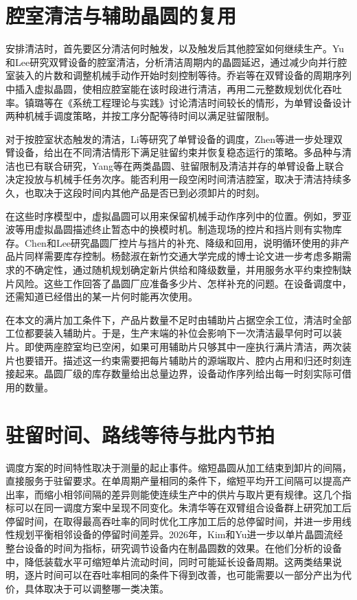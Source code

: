 \section{腔室清洁与辅助晶圆的复用}

安排清洁时，首先要区分清洁何时触发，以及触发后其他腔室如何继续生产。Yu和Lee研究双臂设备的腔室清洁，分析清洁周期内的晶圆延迟，通过减少向并行腔室装入的片数和调整机械手动作开始时刻控制等待\citep{yu2020delay}。乔岩等在双臂设备的周期序列中插入虚拟晶圆，使相应腔室能在该时段进行清洁，再用二元整数规划优化吞吐率\citep{qiao2022binary}。镇璐等在《系统工程理论与实践》讨论清洁时间较长的情形，为单臂设备设计两种机械手调度策略，并按工序分配等待时间以满足驻留限制\citep{zhen2023cnclean}。

对于按腔室状态触发的清洁，Li等研究了单臂设备的调度，Zhen等进一步处理双臂设备，给出在不同清洁情形下满足驻留约束并恢复稳态运行的策略\citep{li2022conditioncleaning,zhen2025cleaning}。多品种与清洁也已有联合研究，Yang等在两类晶圆、驻留限制及清洁并存的单臂设备上联合决定投放与机械手任务次序\citep{yang2025twoclean}。能否利用一段空闲时间清洁腔室，取决于清洁持续多久，也取决于这段时间内其他产品是否已到必须卸片的时刻。

在这些时序模型中，虚拟晶圆可以用来保留机械手动作序列中的位置。例如，罗亚波等用虚拟晶圆描述终止暂态中的换模时机\citep{luo2026mask}。制造现场的控片和挡片则有实物库存。Chen和Lee研究晶圆厂控片与挡片的补充、降级和回用，说明循环使用的非产品片同样需要库存控制\citep{chen2003dummy}。杨懿淑在新竹交通大学完成的博士论文进一步考虑多期需求的不确定性，通过随机规划确定新片供给和降级数量，并用服务水平约束控制缺片风险\citep{yang2009dummyphd}。这些工作回答了晶圆厂应准备多少片、怎样补充的问题。在设备调度中，还需知道已经借出的某一片何时能再次使用。

在本文的满片加工条件下，产品片数量不足时由辅助片占据空余工位，清洁时全部工位都要装入辅助片。于是，生产末端的补位会影响下一次清洁最早何时可以装片。即使两座腔室均已空闲，如果可用辅助片只够其中一座执行满片清洁，两次装片也要错开。描述这一约束需要把每片辅助片的源端取片、腔内占用和归还时刻连接起来。晶圆厂级的库存数量给出总量边界，设备动作序列给出每一时刻实际可借用的数量。

\section{驻留时间、路线等待与批内节拍}

调度方案的时间特性取决于测量的起止事件。缩短晶圆从加工结束到卸片的间隔，直接服务于驻留要求。在单周期产量相同的条件下，缩短平均开工间隔可以提高产出率，而缩小相邻间隔的差异则能使连续生产中的供片与取片更有规律。这几个指标可以在同一调度方案中呈现不同变化。朱清华等在双臂组合设备群上研究加工后停留时间，在取得最高吞吐率的同时优化工序加工后的总停留时间，并进一步用线性规划平衡相邻设备的停留时间差异\citep{zhu2023regulation}。2026年，Kim和Yu进一步以单片晶圆流经整台设备的时间为指标，研究调节设备内在制晶圆数的效果。在他们分析的设备中，降低装载水平可缩短单片流动时间，同时可能延长设备周期\citep{kim2026flow}。这两类结果说明，逐片时间可以在吞吐率相同的条件下得到改善，也可能需要以一部分产出为代价，具体取决于可以调整哪一类决策。

